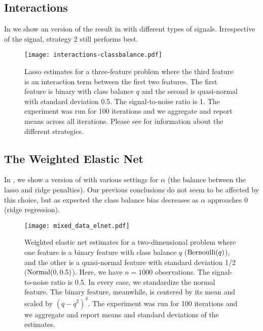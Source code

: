 \subsection{Interactions}%
\label{sec:additional-experiments-interactions}

In  we show an version of the result in 
with different types of signals. Irrespective of the signal, strategy 2 still performs
best.

\begin{figure}[htpb]
  \centering
  \texttt{[image: interactions-classbalance.pdf]}
  \caption{%
    Lasso estimates for a three-feature problem where the third feature is an
    interaction term between the first two features. The first feature is
    binary with class balance \(q\) and the second is quasi-normal with
    standard deviation 0.5. The signal-to-noise ratio is 1. The experiment was
    run for 100 iterations and we aggregate and report means across all
    iterations. Please see  for information
    about the different strategies.
  }
  \label{fig:interactions-full}
\end{figure}

\subsection{The Weighted Elastic Net}%
\label{sec:additional-experiments-weighted-elnet}

In , we show a version of  with
various settings for \(\alpha\) (the balance between the lasso and ridge penalties). Our
previous conclusions do not seem to be affected by this choice, but as expected the class
balance bias decreases as \(\alpha\) approaches 0 (ridge regression).

\begin{figure}[htpb]
  \centering
  \texttt{[image: mixed\_data\_elnet.pdf]}
  \caption{%
    Weighted elastic net estimates for a two-dimensional problem where one feature is a binary
    feature with class balance \(q\) (\(\operatorname{Bernoulli}(q)\)), and the other is a quasi-normal
    feature with standard deviation 1/2 (\(\operatorname{Normal}(0, 0.5)\)). Here, we have \(n = \num{1000}\)
    observations. The signal-to-noise ratio is 0.5. In every case, we standardize the normal
    feature. The binary feature, meanwhile, is centered by its mean and scaled by
    \((q-q^2)^\delta\). The experiment was run for 100 iterations and we aggregate and report
    means and standard deviations of the estimates.
  }
  \label{fig:mixed-data-elnet-full}
\end{figure}
